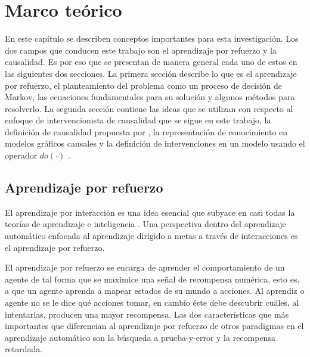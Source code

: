 
\chapter{Marco teórico}

\graphicspath{{Chapter2/Figs/}}

En este capítulo se describen conceptos importantes para esta investigación.
Los dos campos que conducen este trabajo son
el aprendizaje por refuerzo y la causalidad.
Es por eso que se presentan de manera general cada uno
de estos en las siguientes dos
secciones.
La primera sección describe lo que es el aprendizaje
por refuerzo, el planteamiento del problema
como un proceso de decisión de Markov, las ecuaciones
fundamentales para su solución y algunos métodos para
resolverlo.
La segunda sección contiene las ideas que se utilizan
con respecto al enfoque de intervencionista de causalidad que se sigue en este trabajo, la definición de causalidad propuesta
por \cite{spirtes2000causation}, la 
representación de conocimiento en modelos gráficos 
causales y la definición de intervenciones en un modelo usando el operador $do(\cdot)$ \cite{pearl_2009}.

\section{Aprendizaje por refuerzo}

El aprendizaje por interacción es una idea esencial que subyace en casi todas la teorías
de aprendizaje e inteligencia \cite{sutton_barto_2018}.
Una perspectiva dentro del aprendizaje automático enfocada al aprendizaje dirigido a metas a través de interacciones es el aprendizaje por refuerzo.

El aprendizaje por refuerzo se encarga de aprender el comportamiento de un agente 
de tal forma que se maximice una señal de recompensa numérica, esto es, a que un
agente aprenda a mapear estados de su mundo a acciones. Al aprendiz o agente no se le 
dice qué acciones tomar, en cambio éste debe descubrir cuáles, al intentarlas, producen
una mayor recompensa. Las dos características que más importantes que diferencian al
aprendizaje por refuerzo de otros paradigmas en el aprendizaje automático son 
la búsqueda a prueba-y-error y la recompensa retardada.

